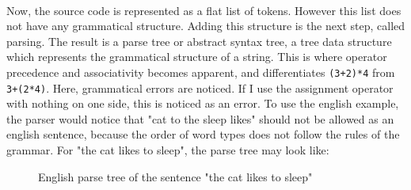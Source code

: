 \documentclass[a4paper, 12pt]{article}
\begin{document}
\\
Now, the source code is represented as a flat list of tokens. However this list does not have any grammatical structure. Adding this structure is the next step, called parsing. The result is a parse tree or abstract syntax tree, a tree data structure which represents the grammatical structure of a string. This is where operator precedence and associativity becomes apparent, and differentiates \verb|(3+2)*4| from \verb|3+(2*4)|. Here, grammatical errors are noticed. If I use the assignment operator with nothing on one side, this is noticed as an error. To use the english example, the parser would notice that "cat to the sleep likes" should not be allowed as an english sentence, because the order of word types does not follow the rules of the grammar. For "the cat likes to sleep", the parse tree may look like:\\

\begin{figure}[ht]
\centering
{}
\caption{English parse tree of the sentence "the cat likes to sleep"}
\end{figure}
\end{document}
